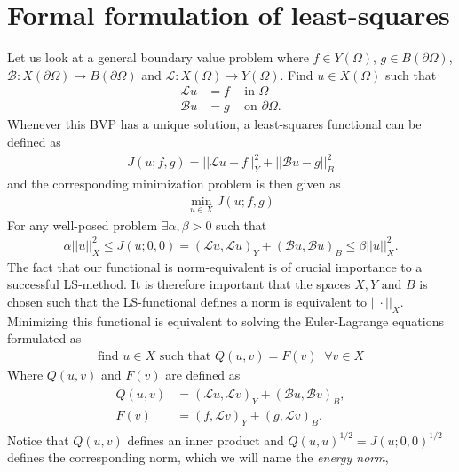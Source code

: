 \section{Formal formulation of least-squares}
Let us look at a general boundary value problem where $f \in Y(\Omega)$, $g \in B(\partial \Omega)$, $\mathcal{B}\colon X(\partial \Omega) \to B(\partial\Omega) $ and $\mathcal{L}\colon X(\Omega)\to Y(\Omega)$. Find $u \in X(\Omega) $ such that 
\begin{align}
	\mathcal{L} u &= f \; \; \; \text{ in } \Omega \\
	\mathcal{B}u &= g \; \; \; \text{ on } \partial \Omega.
	\label{eq:BVP}
\end{align}
Whenever this BVP has a unique solution, a least-squares functional can be defined as 
\begin{align}
	J(u;f,g) = ||\mathcal{L}u-f||^2_Y + ||\mathcal{B}u-g||^2_B
	\label{eq:FunctionalGen}
\end{align}
and the corresponding minimization problem is then given as 
\begin{align}
	\min_{u \in X}J(u;f,g)
	\label{eq:minProbGen}
\end{align}
For any well-posed problem $\exists \alpha,\beta > 0$ such that 
\begin{align}
	\alpha||u||_X^2 \leq J(u;0,0) = (\mathcal{L}u,\mathcal{L}u)_Y+(\mathcal{B}u,\mathcal{B}u)_B \leq \beta||u||_X^2.
	\label{eq:normEq}
\end{align}
The fact that our functional is norm-equivalent is of crucial importance to a successful LS-method. It is therefore important that the spaces $X,Y \text{ and } B$ is chosen such that the LS-functional defines a norm is equivalent to $|| \cdot ||_X$.
Minimizing this functional is equivalent to solving the Euler-Lagrange equations formulated as 
\begin{align}
	\text{find } u \in X \text{  such that  } Q(u,v) = F(v) \; \; \forall v\in X
	\label{eq:varFormGen}
\end{align}
Where $Q(u,v)$ and $F(v)$ are defined as 
\begin{align}
	\begin{split}
	Q(u,v) &= (\mathcal{L}u,\mathcal{L}v)_Y+(\mathcal{B}u,\mathcal{B}v)_B, \\
	F(v) &= (f,\mathcal{L}v)_Y+(g,\mathcal{L}v)_B.
	\end{split}
	\label{eq:VarFormLinForms}
\end{align}
%
Notice that $Q(u,v)$ defines an inner product and $Q(u,u)^{1/2}=J(u;0,0)^{1/2}$ defines the corresponding norm, which we will name the \textit{energy norm},


